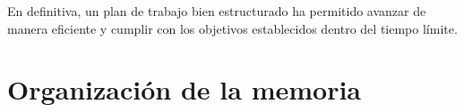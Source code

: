 En definitiva, un plan de trabajo bien estructurado ha permitido avanzar de manera eficiente y cumplir con los objetivos establecidos dentro del tiempo límite.

\section{Organizaci\'on de la memoria}